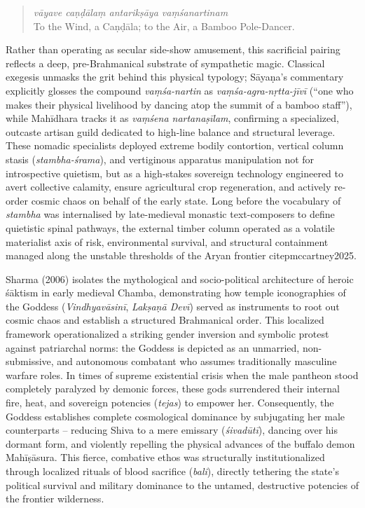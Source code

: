 \documentclass[11pt,twoside,letterpaper]{article}
\begin{document}
\begin{quote}
\textit{vāyave caṇḍālaṃ antarikṣāya vaṃśanartinam}\\
To the Wind, a Caṇḍāla; to the Air, a Bamboo Pole-Dancer.\\
\end{quote} 

Rather than operating as secular side-show amusement, this sacrificial pairing reflects a deep, pre-Brahmanical substrate of sympathetic magic. Classical exegesis unmasks the grit behind this physical typology; Sāyaṇa's commentary explicitly glosses the compound \textit{vaṃśa-nartin} as \textit{vaṃśa-agra-nṛtta-jīvī} (``one who makes their physical livelihood by dancing atop the summit of a bamboo staff''), while Mahīdhara tracks it as \textit{vaṃśena nartanaṣīlam}, confirming a specialized, outcaste artisan guild dedicated to high-line balance and structural leverage. These nomadic specialists deployed extreme bodily contortion, vertical column stasis (\textit{stambha-śrama}), and vertiginous apparatus manipulation not for introspective quietism, but as a high-stakes sovereign technology engineered to avert collective calamity, ensure agricultural crop regeneration, and actively re-order cosmic chaos on behalf of the early state. Long before the vocabulary of \textit{stambha} was internalised by late-medieval monastic text-composers to define quietistic spinal pathways, the external timber column operated as a volatile materialist axis of risk, environmental survival, and structural containment managed along the unstable thresholds of the Aryan frontier citep{mccartney2025}.

Sharma (2006) isolates the mythological and socio-political architecture of heroic śāktism in early medieval Chamba, demonstrating how temple iconographies of the Goddess (\textit{Vindhyavāsinī}, \textit{Lakṣaṇā Devī}) served as instruments to root out cosmic chaos and establish a structured Brahmanical order. This localized framework operationalized a striking gender inversion and symbolic protest against patriarchal norms: the Goddess is depicted as an unmarried, non-submissive, and autonomous combatant who assumes traditionally masculine warfare roles. In times of supreme existential crisis when the male pantheon stood completely paralyzed by demonic forces, these gods surrendered their internal fire, heat, and sovereign potencies (\textit{tejas}) to empower her. Consequently, the Goddess establishes complete cosmological dominance by subjugating her male counterparts -- reducing Shiva to a mere emissary (\textit{śivadūtī}), dancing over his dormant form, and violently repelling the physical advances of the buffalo demon Mahīṣāsura. This fierce, combative ethos was structurally institutionalized through localized rituals of blood sacrifice (\textit{bali}), directly tethering the state's political survival and military dominance to the untamed, destructive potencies of the frontier wilderness.
\end{document}
